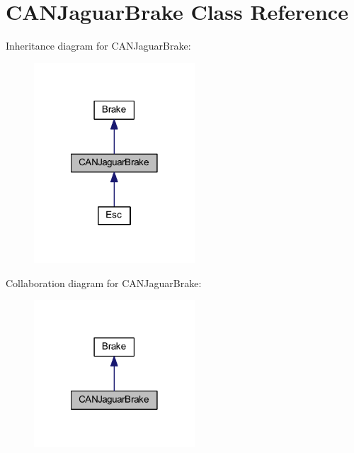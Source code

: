 \hypertarget{class_c_a_n_jaguar_brake}{
\section{\-C\-A\-N\-Jaguar\-Brake \-Class \-Reference}
\label{class_c_a_n_jaguar_brake}
}


\-Inheritance diagram for \-C\-A\-N\-Jaguar\-Brake\-:\nopagebreak
\begin{figure}[H]
\begin{center}
\leavevmode
\includegraphics[width=170pt]{class_c_a_n_jaguar_brake__inherit__graph}
\end{center}
\end{figure}


\-Collaboration diagram for \-C\-A\-N\-Jaguar\-Brake\-:\nopagebreak
\begin{figure}[H]
\begin{center}
\leavevmode
\includegraphics[width=170pt]{class_c_a_n_jaguar_brake__coll__graph}
\end{center}
\end{figure}
